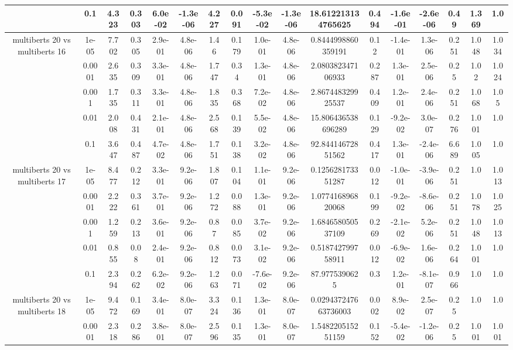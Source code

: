 \begin{tabular}{|c|c|c|c|c|c|c|c|c|c|c|c|c|c|c|c|c|}
 & 0.1 & 4.323 & 0.303 & 6.0e-02 & -1.3e-06 & 4.227 & 0.091 & -5.3e-02 & -1.3e-06 & 18.612213134765625 & 0.494 & -1.6e-01 & -2.6e-06 & 0.49 & 1.369 & 1.0 \\
\hline
\multirow{5}{*}{multiberts 20 vs multiberts 16} & 1e-05 & 7.702 & 0.305 & 2.9e-01 & 4.8e-06 & 1.46 & 0.179 & 1.0e-01 & 4.8e-06 & 0.8444998860359191 & 0.12 & -1.4e-01 & 1.3e-06 & 0.251 & 1.048 & 1.034 \\
 & 0.0001 & 2.635 & 0.309 & 3.3e-01 & 4.8e-06 & 1.747 & 0.34 & 1.3e-01 & 4.8e-06 & 2.080382347106933 & 0.287 & 1.3e-01 & 2.5e-06 & 0.25 & 1.02 & 1.024 \\
 & 0.001 & 1.735 & 0.311 & 3.3e-01 & 4.8e-06 & 1.835 & 0.368 & 7.2e-02 & 4.8e-06 & 2.867448329925537 & 0.409 & 1.2e-01 & 2.4e-06 & 0.251 & 1.068 & 1.05 \\
 & 0.01 & 2.008 & 0.431 & 2.1e-01 & 4.8e-06 & 2.568 & 0.139 & 5.5e-02 & 4.8e-06 & 15.806436538696289 & 0.129 & -9.2e-02 & 3.0e-07 & 0.276 & 1.001 & 1.0 \\
 & 0.1 & 3.647 & 0.487 & 4.7e-02 & 4.8e-06 & 1.751 & 0.138 & 3.2e-02 & 4.8e-06 & 92.84414672851562 & 0.417 & 1.3e-01 & -2.4e-06 & 6.689 & 1.005 & 1.0 \\
\hline
\multirow{5}{*}{multiberts 20 vs multiberts 17} & 1e-05 & 8.477 & 0.212 & 3.3e-01 & 9.2e-06 & 1.807 & 0.104 & 1.1e-01 & 9.2e-06 & 0.125628173351287 & 0.012 & -1.0e-01 & -3.9e-06 & 0.251 & 1.0 & 1.013 \\
 & 0.0001 & 2.222 & 0.361 & 3.7e-01 & 9.2e-06 & 1.272 & 0.088 & 1.3e-01 & 9.2e-06 & 1.077416896820068 & 0.199 & -9.2e-02 & -8.6e-06 & 0.251 & 1.078 & 1.025 \\
 & 0.001 & 1.259 & 0.213 & 3.6e-01 & 9.2e-06 & 0.87 & 0.085 & 3.7e-02 & 9.2e-06 & 1.684658050537109 & 0.269 & -2.1e-02 & 5.2e-06 & 0.251 & 1.048 & 1.013 \\
 & 0.01 & 0.855 & 0.08 & 2.4e-01 & 9.2e-06 & 0.812 & 0.073 & 3.1e-02 & 9.2e-06 & 0.518742799758911 & 0.012 & -6.9e-02 & 1.6e-06 & 0.264 & 1.001 & 1.0 \\
 & 0.1 & 2.394 & 0.262 & 6.2e-02 & 9.2e-06 & 1.263 & 0.071 & -7.6e-02 & 9.2e-06 & 87.9775390625 & 0.3 & 1.2e-01 & -8.1e-07 & 0.966 & 1.0 & 1.0 \\
\hline
\multirow{5}{*}{multiberts 20 vs multiberts 18} & 1e-05 & 9.472 & 0.169 & 3.4e-01 & 8.0e-07 & 3.324 & 0.136 & 1.3e-01 & 8.0e-07 & 0.029437247663736003 & 0.002 & 8.9e-02 & 2.5e-07 & 0.25 & 1.0 & 1.0 \\
 & 0.0001 & 2.318 & 0.286 & 3.8e-01 & 8.0e-07 & 2.596 & 0.135 & 1.3e-01 & 8.0e-07 & 1.548220515251159 & 0.152 & -5.4e-02 & -1.2e-06 & 0.25 & 1.001 & 1.001 \\

\end{tabular}
